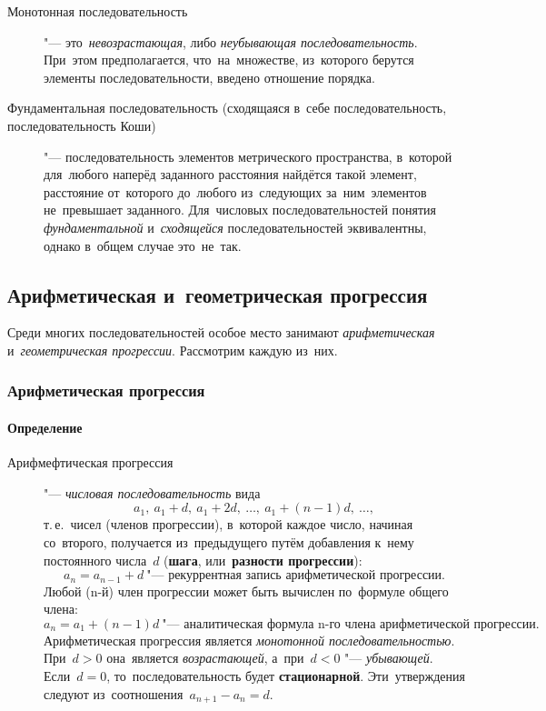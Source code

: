 \documentclass[]{scrartcl}
\begin{document}
{{\begin{description}
	\item[Монотонная последовательность] "--- это~\emph{невозрастающая}, либо \emph{неубывающая последовательность}. При~этом предполагается, что~на~множестве, из~которого берутся элементы последовательности, введено отношение порядка.
	\item[Фундаментальная последовательность (сходящаяся в~себе последовательность,
	последовательность Коши)] "--- последовательность элементов метрического пространства, в~которой для~любого наперёд заданного расстояния найдётся такой элемент, расстояние от~которого до~любого из~следующих за~ним~элементов не~превышает заданного. Для~числовых последовательностей понятия \emph{фундаментальной} и~\emph{сходящейся} последовательностей эквивалентны, однако в~общем случае это~не~так.
\end{description}

\subsection{Арифметическая и~геометрическая прогрессия}
Среди многих последовательностей особое место занимают \emph{арифметическая} и~\emph{геометрическая прогрессии}. Рассмотрим каждую из~них.
\subsubsection{Арифметическая прогрессия}
\paragraph{Определение}
\begin{description}
	\item[Арифмефтическая прогрессия] "--- \emph{числовая последовательность} вида
	\begin{equation}\label{eq:arithmetic-progression-1}
	a_1,\ a_1+d,\ a_1+2d,\ \ldots,\ a_1+(n-1)d, \ \ldots,
	\end{equation}
	т.\,е.~чисел (членов прогрессии), в~которой каждое число, начиная со~второго, получается из~предыдущего путём добавления к~нему постоянного числа~${\textstyle d}$ (\textbf{шага}, или~\textbf{разности прогрессии}):
	\begin{equation}\label{eq:arithmetic-progression-2}
	a_{n}=a_{n-1}+d\ \text{"--- рекуррентная запись арифметической прогрессии.}
	\end{equation} 
	Любой (n-й) член прогрессии может быть вычислен по~формуле общего члена:
	\begin{equation}\label{eq:arithmetic-progression-3}
	a_n=a_1 + (n-1)d\ \text{"--- аналитическая формула n-го члена арифметической прогрессии.}
	\end{equation}
	Арифметическая прогрессия является \emph{монотонной последовательностью}. При~${\textstyle d>0}$ она~является \emph{возрастающей}, а~при~${\textstyle d<0}$ "--- \emph{убывающей}. Если~${\textstyle d=0}$, то~последовательность будет \textbf{стационарной}. Эти~утверждения следуют из~соотношения~${\textstyle a_{n+1}-a_{n}=d}$. 
\end{description}
}}
\end{document}
